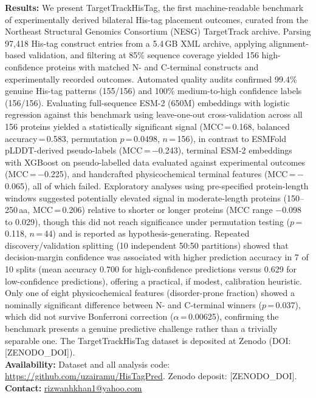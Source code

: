 \documentclass[unnumsec,webpdf,contemporary,large]{oup-authoring-template}
\begin{document}
{\textbf{Results:} We present TargetTrackHisTag, the first machine-readable benchmark of experimentally derived bilateral His-tag placement outcomes, curated from the Northeast Structural Genomics Consortium (NESG) TargetTrack archive. Parsing 97,418 His-tag construct entries from a 5.4\,GB XML archive, applying alignment-based validation, and filtering at 85\% sequence coverage yielded 156 high-confidence proteins with matched N- and C-terminal constructs and experimentally recorded outcomes. Automated quality audits confirmed 99.4\% genuine His-tag patterns (155/156) and 100\% medium-to-high confidence labels (156/156). Evaluating full-sequence ESM-2 (650M) embeddings with logistic regression against this benchmark using leave-one-out cross-validation across all 156 proteins yielded a statistically significant signal (MCC\,=\,0.168, balanced accuracy\,=\,0.583, permutation $p$\,=\,0.0498, $n$\,=\,156), in contrast to ESMFold pLDDT-derived pseudo-labels (MCC\,=\,$-$0.243), terminal ESM-2 embeddings with XGBoost on pseudo-labelled data evaluated against experimental outcomes (MCC\,=\,$-$0.225), and handcrafted physicochemical terminal features (MCC\,=\,$-$0.065), all of which failed. Exploratory analyses using pre-specified protein-length windows suggested potentially elevated signal in moderate-length proteins (150--250\,aa, MCC\,=\,0.206) relative to shorter or longer proteins (MCC range $-$0.098 to 0.029), though this did not reach significance under permutation testing ($p$\,=\,0.118, $n$\,=\,44) and is reported as hypothesis-generating. Repeated discovery/validation splitting (10 independent 50:50 partitions) showed that decision-margin confidence was associated with higher prediction accuracy in 7 of 10 splits (mean accuracy 0.700 for high-confidence predictions versus 0.629 for low-confidence predictions), offering a practical, if modest, calibration heuristic. Only one of eight physicochemical features (disorder-prone fraction) showed a nominally significant difference between N- and C-terminal winners ($p$\,=\,0.037), which did not survive Bonferroni correction ($\alpha$\,=\,0.00625), confirming the benchmark presents a genuine predictive challenge rather than a trivially separable one. The TargetTrackHisTag dataset is deposited at Zenodo (DOI: [ZENODO\_DOI]).\\
\textbf{Availability:} Dataset and all analysis code: \url{https://github.com/uzairamu/HisTagPred}. Zenodo deposit: [ZENODO\_DOI].\\
\textbf{Contact:} \href{rizwanhkhan1@yahoo.com}{rizwanhkhan1@yahoo.com}}
\end{document}
